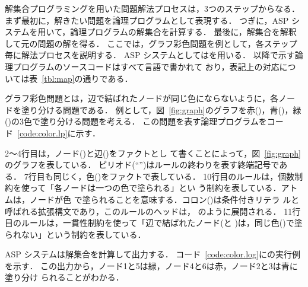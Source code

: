 解集合プログラミングを用いた問題解法プロセスは，3つのステップからなる．
まず最初に，解きたい問題を論理プログラムとして表現する．
つぎに，ASP システムを用いて，論理プログラムの解集合を計算する．
最後に，解集合を解釈して元の問題の解を得る．
%
ここでは，グラフ彩色問題を例として，各ステップ毎に解法プロセスを説明する．
ASP システムとしては{\clingo}を用いる．
以降で示す論理プログラムのソースコードはすべて{\gringo}言語で書かれて
おり，表記上の対応については表~\ref{tbl:map}の通りである．

グラフ彩色問題とは，辺で結ばれたノードが同じ色にならないように，各ノー
ドを塗り分ける問題である．
例として，図~\ref{fig:graph}のグラフを赤()，青()，緑
()の3色で塗り分ける問題を考える．
この問題を表す論理プログラムをコード~\ref{code:color.lp}に示す．

2〜4行目は，ノード()と辺()をファクトとし
て書くことによって，図~\ref{fig:graph}のグラフを表している．
ピリオド(``'')はルールの終わりを表す終端記号である．
7行目も同じく，色()をファクトで表している．
%
10行目のルールは，個数制約を使って「各ノードは一つの色で塗られる」とい
う制約を表している．アトムは，ノードが色
で塗られることを意味する．コロン(\code{:})は条件付きリテラ
ルと呼ばれる拡張構文であり，このルールのヘッドは，
のように展開される．
11行目のルールは，一貫性制約を使って「辺で結ばれたノード(と
)は，同じ色()で塗られない」という制約を表している．

ASP システムは解集合を計算して出力する．
コード~\ref{code:color.log}に{\clingo}の実行例を示す．
この出力から，ノード1と5は緑，ノード4と6は赤，ノード2と3は青に塗り分け
られることがわかる．





